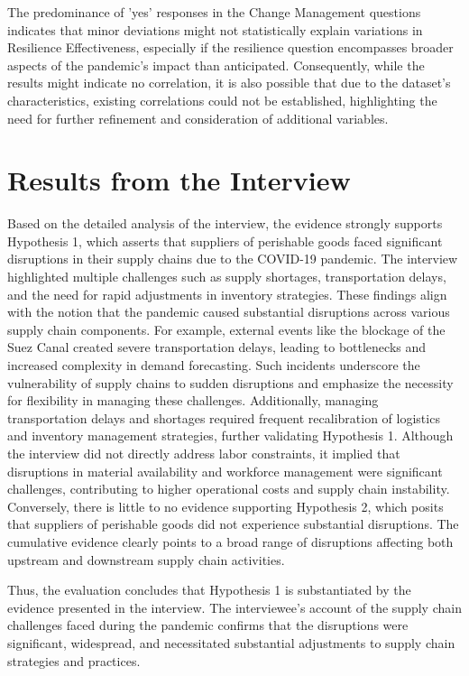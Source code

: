 The predominance of 'yes' responses in the Change Management questions indicates that minor deviations might not statistically explain variations in Resilience Effectiveness, especially if the resilience question encompasses broader aspects of the pandemic's impact than anticipated. Consequently, while the results might indicate no correlation, it is also possible that due to the dataset's characteristics, existing correlations could not be established, highlighting the need for further refinement and consideration of additional variables.


\section{Results from the Interview}

Based on the detailed analysis of the interview, the evidence strongly supports Hypothesis 1, which asserts that suppliers of perishable goods faced significant disruptions in their supply chains due to the COVID-19 pandemic. The interview highlighted multiple challenges such as supply shortages, transportation delays, and the need for rapid adjustments in inventory strategies. These findings align with the notion that the pandemic caused substantial disruptions across various supply chain components. For example, external events like the blockage of the Suez Canal created severe transportation delays, leading to bottlenecks and increased complexity in demand forecasting. Such incidents underscore the vulnerability of supply chains to sudden disruptions and emphasize the necessity for flexibility in managing these challenges. Additionally, managing transportation delays and shortages required frequent recalibration of logistics and inventory management strategies, further validating Hypothesis 1. Although the interview did not directly address labor constraints, it implied that disruptions in material availability and workforce management were significant challenges, contributing to higher operational costs and supply chain instability. Conversely, there is little to no evidence supporting Hypothesis 2, which posits that suppliers of perishable goods did not experience substantial disruptions. The cumulative evidence clearly points to a broad range of disruptions affecting both upstream and downstream supply chain activities.

Thus, the evaluation concludes that Hypothesis 1 is substantiated by the evidence presented in the interview. The interviewee's account of the supply chain challenges faced during the pandemic confirms that the disruptions were significant, widespread, and necessitated substantial adjustments to supply chain strategies and practices.

